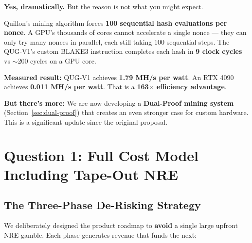 \documentclass[11pt,a4paper]{article}
\begin{document}
\vspace{0.5cm}

\begin{answerbox}
\textbf{Yes, dramatically.} But the reason is not what you might expect.

Quillon's mining algorithm forces \textbf{100 sequential hash evaluations per nonce}. A GPU's thousands of cores cannot accelerate a single nonce --- they can only try many nonces in parallel, each still taking 100 sequential steps. The QUG-V1's custom BLAKE3 instruction completes each hash in \textbf{9 clock cycles} vs $\sim$200 cycles on a GPU core.

\textbf{Measured result:} QUG-V1 achieves \textbf{1.79 MH/s per watt}. An RTX 4090 achieves \textbf{0.011 MH/s per watt}. That is a \textbf{163$\times$ efficiency advantage}.

\textbf{But there's more:} We are now developing a \textbf{Dual-Proof mining system} (Section~\ref{sec:dual-proof}) that creates an even stronger case for custom hardware. This is a significant update since the original proposal.
\end{answerbox}


\section{Question 1: Full Cost Model Including Tape-Out NRE}

\subsection{The Three-Phase De-Risking Strategy}

We deliberately designed the product roadmap to \textbf{avoid} a single large upfront NRE gamble. Each phase generates revenue that funds the next:
\end{document}
